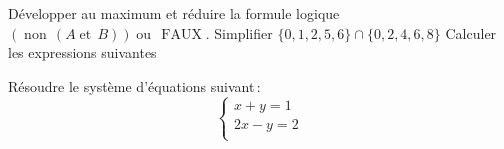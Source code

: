 \documentclass[a4paper, 11pt]{exam}
\begin{document}
\begin{questions}
	\question Développer au maximum et réduire la formule logique \((\operatorname{non}\,(A \operatorname{et}\,B))\operatorname{ou}\,\operatorname{FAUX}\).
	\question Simplifier \(\{0, 1, 2, 5, 6\} ∩ \{0, 2, 4, 6, 8\}\)
	\question Calculer les expressions suivantes
	\question Résoudre le système d'équations suivant :
		\begin{equation}
			\begin{cases}
				x + y = 1\\
				2x - y = 2\\
			\end{cases}
		\end{equation}
\end{questions}
\end{document}
